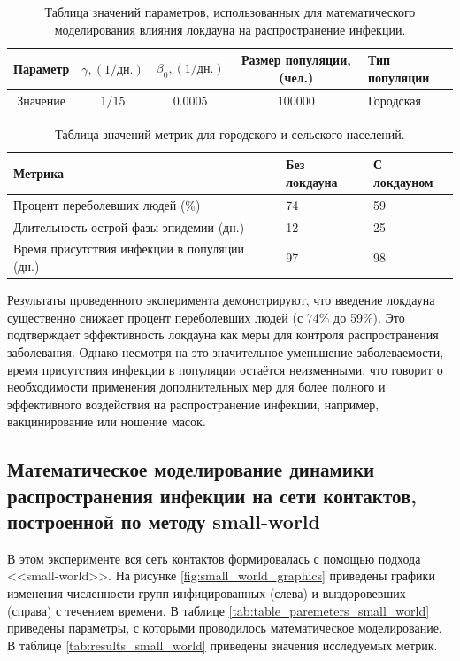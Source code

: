 \documentclass[14pt,a4paper]{article}
\begin{document}
\begin{table}[h!]
	\centering
	\caption{Таблица значений параметров, использованных для математического моделирования влияния локдауна на распространение инфекции.}
	\begin{tabularx}{\textwidth}{|c|c|c|c|X|} %
		\hline
		Параметр & $\gamma,  (1/\text{дн.})$ & $\beta_0,  (1/\text{дн.})$ & Размер популяции, (чел.) & Тип популяции \\
		\hline
		Значение & $1/15$ & $0.0005$ & $100000$ & Городская \\
		\hline
	\end{tabularx}
	\label{tab:table_paremeters_loc_nonloc}
\end{table}

\begin{table}[h!]
	\caption{Таблица значений метрик для городского и сельского населений.}
	\centering
	\begin{tabularx}{\textwidth}{|X|X|X|}
		\hline
		Метрика & Без локдауна & С локдауном \\ 
		\hline
		Процент переболевших людей (\%) & 74 & 59 \\ 
		\hline
		Длительность острой фазы эпидемии (дн.) & 12 & 25\\ 
		\hline
     	Время присутствия инфекции в популяции (дн.) & 97 & 98\\ 
		\hline
	\end{tabularx}
	
	\label{tab:res_loc_nonloc}
\end{table}

\newpage
Результаты проведенного эксперимента демонстрируют, что введение локдауна существенно снижает процент переболевших людей (с 74\% до 59\%). Это подтверждает эффективность локдауна как меры для контроля распространения заболевания. Однако несмотря на это значительное уменьшение заболеваемости, время присутствия инфекции в популяции остаётся неизменными, что говорит о необходимости применения дополнительных мер для более полного и эффективного воздействия на распространение инфекции, например, вакцинирование или ношение масок.


\subsection{Математическое моделирование динамики распространения инфекции на сети контактов, построенной по методу small-world} 

В этом эксперименте вся сеть контактов формировалась с помощью подхода <<small-world>>.
На рисунке \ref{fig:small_world_graphics} приведены графики изменения численности групп инфицированных (слева) и выздоровевших (справа) с течением времени. В таблице \ref{tab:table_paremeters_small_world} приведены параметры, с которыми проводилось математическое моделирование. В таблице \ref{tab:results_small_world} приведены значения исследуемых метрик. 
\end{document}

